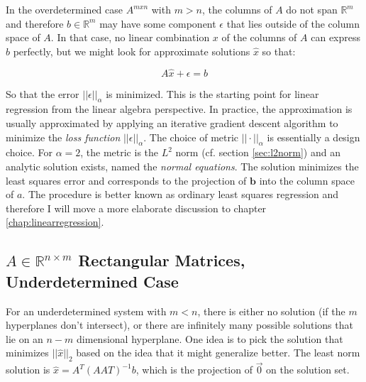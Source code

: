 In the overdetermined case $A^{mxn}$ with $m>n$, the columns of $A$ do not span $\mathbb{R}^m$ and therefore $b\in\mathbb{R}^m$ may have some component $\epsilon$ that lies outside of the column space of $A$. In that case, no linear combination $x$ of the columns of $A$ can express $b$ perfectly, but we might look for approximate solutions $\hat{x}$ so that:

\begin{equation}
A\hat{x} + \epsilon = b
\end{equation}

So that the error $||\epsilon||_{\alpha}$ is minimized. This is the starting point for linear regression from the linear algebra perspective. In practice, the approximation is usually approximated by applying an iterative gradient descent algorithm to minimize the \textit{loss function} $||\epsilon||_{\alpha}$. The choice of metric $||\cdot||_{\alpha}$ is essentially a design choice. For $\alpha=2$, the metric is the $L^2$ norm (cf. section \ref{sec:l2norm}) and an analytic solution exists, named the \textit{normal equations}. The solution minimizes the least squares error and corresponds to the projection of $\mathbf{b}$ into the column space of $a$. The procedure is better known as ordinary least squares regression and therefore I will move a more elaborate discussion to chapter \ref{chap:linearregression}.

\subsection{$A\in\mathbb{R}^{n\times m}$ Rectangular Matrices, Underdetermined Case}
For an underdetermined system with $m<n$, there is either no solution (if the $m$ hyperplanes don't intersect), or there are infinitely many possible solutions that lie on an $n-m$ dimensional hyperplane. One idea is to pick the solution that minimizes $||\hat{x}||_2$ based on the idea that it might generalize better. The least norm solution is $\hat{x} = A^T\left(AAT\right)^{-1}b$, which is the projection of $\vec{0}$ on the solution set.
